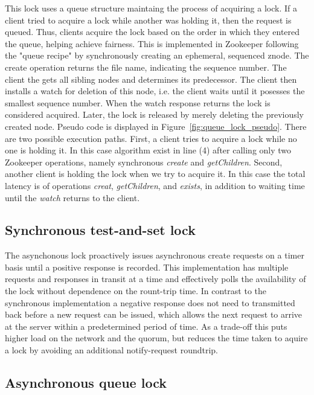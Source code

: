 This lock uses a queue structure maintaing the process of acquiring a lock. If a client tried to acquire a lock while another was holding it, then the request is queued. Thus, clients acquire the lock based on the order in which they entered the queue, helping achieve fairness. This is implemented in Zookeeper following the "queue recipe" by synchronously creating an ephemeral, sequenced znode. The create operation returns the file name, indicating the sequence number. The client the gets all sibling nodes and determines its predecessor. The client then installs a watch for deletion of this node, i.e. the client waits until it posesses the smallest sequence number. When the watch response returns the lock is considered acquired. Later, the lock is released by merely deleting the previously created node. Pseudo code is displayed in Figure~\ref{fig:queue_lock_pseudo}. There are two possible execution paths. First, a client tries to acquire a lock while no one is holding it. In this case algorithm exist in line (4) after calling only two Zookeeper operations, namely synchronous \emph{create} and \emph{getChildren}. Second, another client is holding the lock when we try to acquire it. In this case the total latency is of operations \emph{creat}, \emph{getChildren}, and \emph{exists}, in addition to waiting time until the \emph{watch} returns to the client.

\subsection{Synchronous test-and-set lock}

The asynchonous lock proactively issues asynchronous create requests on a timer basis until a positive response is recorded. This implementation has multiple requests and responses in transit at a time and effectively polls the availability of the lock without dependence on the rount-trip time. In contrast to the synchronous implementation a negative response does not need to transmitted back before a new request can be issued, which allows the next request to arrive at the server within a predetermined period of time. As a trade-off this puts higher load on the network and the quorum, but reduces the time taken to aquire a lock by avoiding an additional notify-request roundtrip.

\subsection{Asynchronous queue lock}

